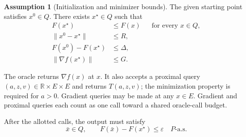 \documentclass[10pt]{article}
\theoremstyle{definition}
\newtheorem{assumption}{Assumption}
\begin{document}
\begin{assumption}[Initialization and minimizer bounds]
The given starting point satisfies $x^0\in Q$. There exists $x^\star\in Q$ such that
\[
\begin{aligned}
F(x^\star)&\leq F(x) &&\text{for every }x\in Q,\\
\|x^0-x^\star\|&\leq R,\\
F(x^0)-F(x^\star)&\leq\Delta,\\
\|\nabla f(x^\star)\|&\leq G.
\end{aligned}
\]
\end{assumption}

The oracle returns $\nabla f(x)$ at $x$. It also accepts a proximal query $(a,z,v)\in\mathbb{R}\times E\times E$ and returns $T(a,z,v)$; the minimization property is required for $a>0$. Gradient queries may be made at any $x\in E$. Gradient and proximal queries each count as one call toward a shared oracle-call budget.

After the allotted calls, the output must satisfy
\[
\bar{x}\in Q,
\qquad F(\bar{x})-F(x^\star)\leq\varepsilon
\quad P\text{-a.s.}
\]
\end{document}
